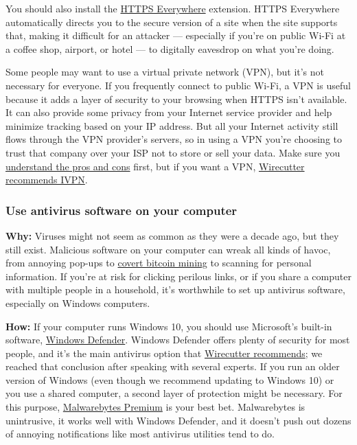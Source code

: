 You should also install the
\href{https://www.eff.org/https-everywhere/faq}{HTTPS Everywhere}
extension. HTTPS Everywhere automatically directs you to the secure
version of a site when the site supports that, making it difficult for
an attacker --- especially if you're on public Wi-Fi at a coffee shop,
airport, or hotel --- to digitally eavesdrop on what you're doing.

Some people may want to use a virtual private network (VPN), but it's
not necessary for everyone. If you frequently connect to public Wi-Fi, a
VPN is useful because it adds a layer of security to your browsing when
HTTPS isn't available. It can also provide some privacy from your
Internet service provider and help minimize tracking based on your IP
address. But all your Internet activity still flows through the VPN
provider's servers, so in using a VPN you're choosing to trust that
company over your ISP not to store or sell your data. Make sure you
\href{https://thewirecutter.com/reviews/what-is-a-vpn/}{understand the
pros and cons} first, but if you want a VPN,
\href{https://thewirecutter.com/reviews/best-vpn-service/}{Wirecutter
recommends IVPN}.

\hypertarget{use-antivirus-software-on-your-computer}{%
\subsubsection{Use antivirus software on your
computer}\label{use-antivirus-software-on-your-computer}}

\textbf{Why:} Viruses might not seem as common as they were a decade
ago, but they still exist. Malicious software on your computer can wreak
all kinds of havoc, from annoying pop-ups to
\href{https://www.zdnet.com/article/cryptocurrency-mining-malware-why-it-is-such-a-menace-and-where-its-going-next/}{covert
bitcoin mining} to scanning for personal information. If you're at risk
for clicking perilous links, or if you share a computer with multiple
people in a household, it's worthwhile to set up antivirus software,
especially on Windows computers.~

\textbf{How:} If your computer runs Windows 10, you should use
Microsoft's built-in software,
\href{https://support.microsoft.com/en-us/help/17464/windows-10-help-protect-my-device-with-windows-security}{Windows
Defender}. Windows Defender offers plenty of security for most people,
and it's the main antivirus option that
\href{https://thewirecutter.com/blog/best-antivirus/}{Wirecutter
recommends}; we reached that conclusion after speaking with several
experts. If you run an older version of Windows (even though we
recommend updating to Windows 10) or you use a shared computer, a second
layer of protection might be necessary. For this purpose,
\href{https://www.malwarebytes.com/}{Malwarebytes Premium} is your best
bet. Malwarebytes is unintrusive, it works well with Windows Defender,
and it doesn't push out dozens of annoying notifications like most
antivirus utilities tend to do.

